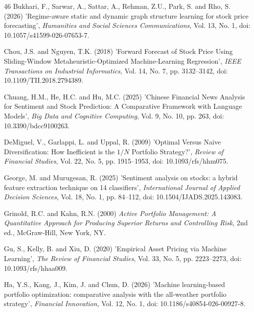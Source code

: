 \documentclass{singlecol-new}
\theoremstyle{TH}{
\newtheorem{lemma}{Lemma}
\newtheorem{theorem}[lemma]{Theorem}
\newtheorem{corrolary}[lemma]{Corrolary}
\newtheorem{conjecture}[lemma]{Conjecture}
\newtheorem{proposition}[lemma]{Proposition}
\newtheorem{claim}[lemma]{Claim}
\newtheorem{stheorem}[lemma]{Wrong Theorem}
\newtheorem{algorithm}{Algorithm}
}
\theoremstyle{THrm}{
\newtheorem{definition}{Definition}[section]
\newtheorem{question}{Question}[section]
\newtheorem{remark}{Remark}
\newtheorem{scheme}{Scheme}
}
\theoremstyle{THhit}{
\newtheorem{case}{Case}[section]
}
\begin{document}
\begin{thebibliography}{46}
Bukhari, F., Sarwar, A., Sattar, A., Rehman, Z.U., Park, S. and Rho, S. (2026) 'Regime-aware static and dynamic graph structure learning for stock price forecasting', {\it Humanities and Social Sciences Communications}, Vol. 13, No. 1, doi: 10.1057/s41599-026-07653-7.

Chou, J.S. and Nguyen, T.K. (2018) 'Forward Forecast of Stock Price Using Sliding-Window Metaheuristic-Optimized Machine-Learning Regression', {\it IEEE Transactions on Industrial Informatics}, Vol. 14, No. 7, pp. 3132--3142, doi: 10.1109/TII.2018.2794389.

Chuang, H.M., He, H.C. and Hu, M.C. (2025) 'Chinese Financial News Analysis for Sentiment and Stock Prediction: A Comparative Framework with Language Models', {\it Big Data and Cognitive Computing}, Vol. 9, No. 10, pp. 263, doi: 10.3390/bdcc9100263.

DeMiguel, V., Garlappi, L. and Uppal, R. (2009) 'Optimal Versus Naive Diversification: How Inefficient is the $1/N$ Portfolio Strategy?', {\it Review of Financial Studies}, Vol. 22, No. 5, pp. 1915--1953, doi: 10.1093/rfs/hhm075.

George, M. and Murugesan, R. (2025) 'Sentiment analysis on stocks: a hybrid feature extraction technique on 14 classifiers', {\it International Journal of Applied Decision Sciences}, Vol. 18, No. 1, pp. 84--112, doi: 10.1504/IJADS.2025.143083.

Grinold, R.C. and Kahn, R.N. (2000) {\it Active Portfolio Management: A Quantitative Approach for Producing Superior Returns and Controlling Risk}, 2nd ed., McGraw-Hill, New York, NY.

Gu, S., Kelly, B. and Xiu, D. (2020) 'Empirical Asset Pricing via Machine Learning', {\it The Review of Financial Studies}, Vol. 33, No. 5, pp. 2223--2273, doi: 10.1093/rfs/hhaa009.

Ha, Y.S., Kang, J., Kim, J. and Chun, D. (2026) 'Machine learning-based portfolio optimization: comparative analysis with the all-weather portfolio strategy', {\it Financial Innovation}, Vol. 12, No. 1, doi: 10.1186/s40854-026-00927-8.


\end{thebibliography}
\end{document}
